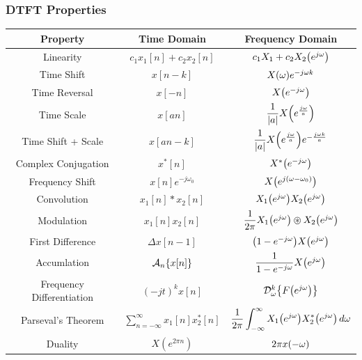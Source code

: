 \documentclass[11pt]{article}
\begin{document}
  \subsubsection{DTFT Properties}

  \bgroup
  \renewcommand{\arraystretch}{2.1}
  \setlength{\tabcolsep}{0.8cm}
  \large\begin{tabular}{c|c|c}
    Property & Time Domain & Frequency Domain \\
    \toprule
    Linearity & \(c_1x_1[n] + c_2x_2[n]\) & \(c_1X_1 + c_2X_2{\left( e^{j\omega} \right)}\) \\
    Time Shift & \(x[n - k]\) & \(X{\left( \omega \right)}e^{-j\omega k}\)\\
    Time Reversal & \(x[-n]\) & \(X{\left( e^{-j\omega} \right)}\)\\
    Time Scale & \(x[an]\) & \(\dfrac{1}{|a|}X{\left( e^{\frac{j\omega}{a}} \right)}\)\\
    Time Shift + Scale & \(x[an - k]\) & \(\dfrac{1}{|a|}X{\left( e^{\frac{j\omega}{a}} \right)}e^{-\frac{j\omega k}{a}}\)\\
    Complex Conjugation & \(x^*[n]\) & \(X^*{\left( e^{-j\omega} \right)}\)\\
    Frequency Shift & \(x[n]e^{-j\omega_0}\) & \(X{\left( e^{j(\omega - \omega_0)} \right)}\)\\
    Convolution & \(x_1[n] * x_2[n]\) & \(X_1{\left( e^{j\omega} \right)}X_2{\left( e^{j\omega} \right)}\) \\
    Modulation & \(x_1[n]x_2[n]\) & \(\dfrac{1}{2\pi} X_1\prn{e^{j\omega}} \oast X_2\prn{e^{j\omega}}\) \\
    First Difference & \(\Delta x[n - 1]\) & \({\left( 1 - e^{-j\omega} \right)}X{\left( e^{j\omega} \right)}\) \\
    Accumlation & \(\mathcal{A}_n\{x[n]\}\) & \(\dfrac{1}{1 - e^{-j\omega}}X{\left( e^{j\omega} \right)}\) \\
    Frequency Differentiation & \((-jt)^k x[n]\) & \(\mathcal{D}_{\omega}^k{\left\{ F{\left( e^{j\omega} \right)} \right\}}\) \\
    Parseval's Theorem & \(\displaystyle\sum_{n = -\infty}^{\infty} x_1[n]x_2^*[n] \) &
    \(\dfrac{1}{2\pi}\displaystyle\int_{-\infty}^{\infty} X_1{\left( e^{j\omega} \right)}X_2^*{\left( e^{j\omega} \right)} \,d\omega\) \\
    Duality & \(X(e^{2\pi n})\) & \(2\pi x{\left( -\omega \right)}\)
  \end{tabular}
  \egroup

  \pagebreak
\end{document}
